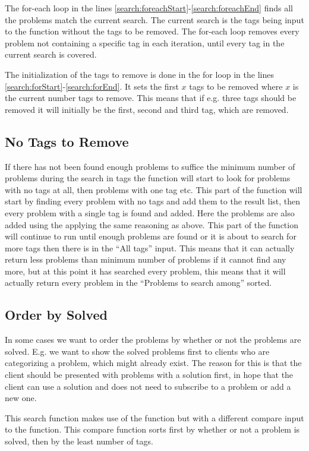 The for-each loop in the lines \ref{search:foreachStart}-\ref{search:foreachEnd} finds all the problems match the current search.
The current search is the tags being input to the function without the tags to be removed.
The for-each loop removes every problem not containing a specific tag in each iteration, until every tag in the current search is covered.

The initialization of the tags to remove is done in the for loop in the lines \ref{search:forStart}-\ref{search:forEnd}.
It sets the first $x$ tags to be removed where $x$ is the current number tags to remove.
This means that if e.g. three tags should be removed it will initially be the first, second and third tag, which are removed.

\subsection{No Tags to Remove}
\label{sub:noTags}
If there has not been found enough problems to suffice the minimum number of problems during the search in tags the function will start to look for problems with no tags at all, then problems with one tag etc.
This part of the function will start by finding every problem with no tags and add them to the result list, then every problem with a single tag is found and added.
Here the problems are also added using the  applying the same reasoning as above.
This part of the function will continue to run until enough problems are found or it is about to search for more tags then there is in the ``All tags'' input.
This means that it can actually return less problems than minimum number of problems if it cannot find any more, but at this point it has searched every problem, this means that it will actually return every problem in the ``Problems to search among'' sorted.

\subsection{Order by Solved}
\label{sub:orderSolved}
In some cases we want to order the problems by whether or not the problems are solved.
E.g. we want to show the solved problems first to clients who are categorizing a problem, which might already exist.
The reason for this is that the client should be presented with problems with a solution first, in hope that the client can use a solution and does not need to subscribe to a problem or add a new one.

This search function makes use of the  function but with a different compare input to the  function.
This compare function sorts first by whether or not a problem is solved, then by the least number of tags.